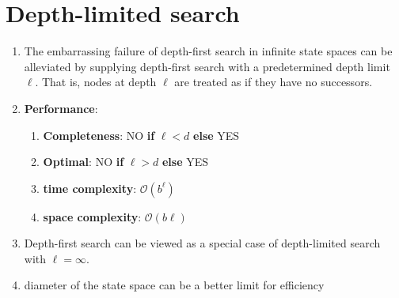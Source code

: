 \section{Depth-limited search \cite{ai/book/Artificial-Intelligence-A-Modern-Approach/Russell-Norvig}}

\begin{enumerate}[itemsep=0.2cm]
    \item The embarrassing failure of depth-first search in infinite state spaces can be alleviated by supplying depth-first search with a predetermined depth limit $\ell$. That is, nodes at depth  $\ell$ are treated as if they have no successors. 
    \hfill \cite{ai/book/Artificial-Intelligence-A-Modern-Approach/Russell-Norvig}

    \item \textbf{Performance}:
    \begin{enumerate}
        \item \textbf{Completeness}: NO \textbf{if} $\ell < d$ \textbf{else} YES
        \hfill \cite{ai/book/Artificial-Intelligence-A-Modern-Approach/Russell-Norvig}

        \item \textbf{Optimal}: NO \textbf{if} $\ell > d$ \textbf{else} YES
        \hfill \cite{ai/book/Artificial-Intelligence-A-Modern-Approach/Russell-Norvig}

        \item \textbf{time complexity}: $\mathcal{O}(b^\ell)$
        \hfill \cite{ai/book/Artificial-Intelligence-A-Modern-Approach/Russell-Norvig}

        \item \textbf{space complexity}: $\mathcal{O}(b\ell)$
        \hfill \cite{ai/book/Artificial-Intelligence-A-Modern-Approach/Russell-Norvig}
    \end{enumerate}

    \item Depth-first search can be viewed as a special case of depth-limited search with $\ell = \infty$.
    \hfill \cite{ai/book/Artificial-Intelligence-A-Modern-Approach/Russell-Norvig}

    \item diameter of the state space can be a better limit for efficiency
    \hfill \cite{ai/book/Artificial-Intelligence-A-Modern-Approach/Russell-Norvig}

    
\end{enumerate}


\vspace{0.5cm}

